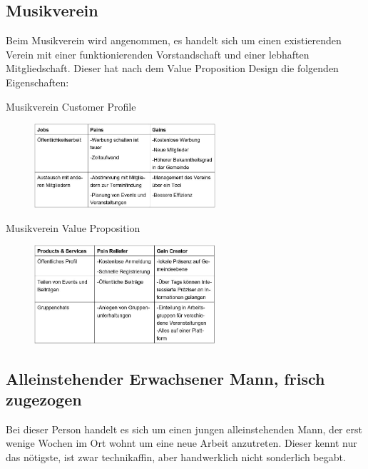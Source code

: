 \subsection*{Musikverein}
Beim Musikverein wird angenommen, es handelt sich um einen existierenden Verein mit einer funktionierenden Vorstandschaft und einer lebhaften Mitgliedschaft.
Dieser hat nach dem Value Proposition Design die folgenden Eigenschaften:

\begin{table}[H]
    \centering
    \caption{Musikverein Customer Profile}
\end{table}

\begin{figure}[H]
    \centering
    \includegraphics[width=0.6\textwidth]{figures/andre/musikvereincustomerprofile.JPG}
    \label{fig:musikvereincustomerprofile}
\end{figure}

\begin{table}[H]
    \centering
    \caption{Musikverein Value Proposition}
\end{table}

\begin{figure}[H]
    \centering
    \includegraphics[width=0.6\textwidth]{figures/andre/musikvereinvalueproposition.JPG}
    \label{fig:musikvereinvalueproposition}
\end{figure}

\subsection*{Alleinstehender Erwachsener Mann, frisch zugezogen}
Bei dieser Person handelt es sich um einen jungen alleinstehenden Mann, der erst wenige Wochen im Ort wohnt um eine neue Arbeit anzutreten. Dieser kennt nur das nötigste, ist zwar technikaffin, aber handwerklich nicht sonderlich begabt.

